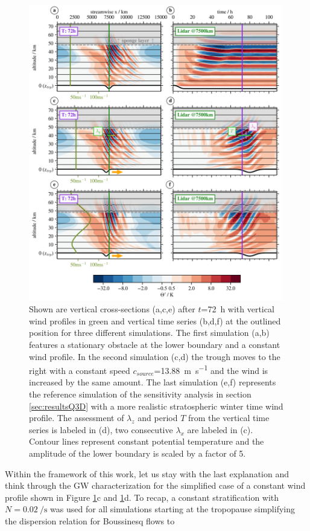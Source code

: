 \begin{figure}[tbp]
    \centering
    \includegraphics[width=0.99\textwidth]{figures_lidar/lidana_th.png}
    \caption{Shown are vertical cross-sections (a,c,e) after $t$=\SI{72}{\hour} with vertical wind profiles in green and vertical time series (b,d,f) at the outlined position for three different simulations. The first simulation (a,b) features a stationary obstacle at the lower boundary and a constant wind profile. In the second simulation (c,d) the trough moves to the right with a constant speed $c_{source}$=\SI{13.88}{\meter \per \second} and the wind is increased by the same amount. The last simulation (e,f) represents the reference simulation of the sensitivity analysis in section \ref{sec:resultsQ3D} with a more realistic stratospheric winter time wind profile. The assessment of $\lambda_z$ and period $T$ from the vertical time series is labeled in (d), two consecutive $\lambda_x$ are labeled in (c). Contour lines represent constant potential temperature and the amplitude of the lower boundary is scaled by a factor of 5.}
    \label{fig:lidar_sim}
\end{figure}

Within the framework of this work, let us stay with the last explanation and think through the GW characterization for the simplified case of a constant wind profile shown in Figure \ref{fig:lidar_sim}c and \ref{fig:lidar_sim}d. To recap, a constant stratification with $N=\SI{0.02}{\per \second}$ was used for all simulations starting at the tropopause simplifying the dispersion relation for Boussinesq flows to

